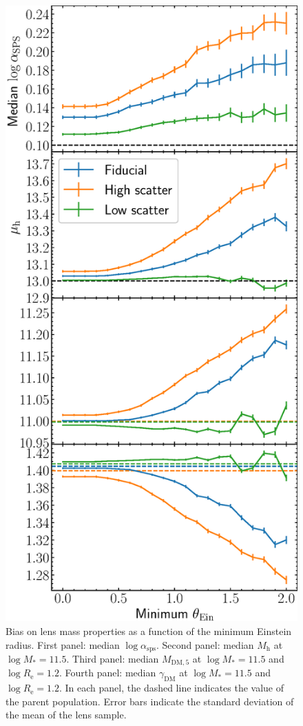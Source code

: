 \documentclass{aa}
\def\reff{R_{\mathrm{e}}}
\def\mstar{M_*}
\def\asps{\alpha_{\mathrm{sps}}}
\def\gammadm{\gamma_{\mathrm{DM}}}
\def\mdmfive{M_{\mathrm{DM}, 5}}
\def\mhalo{M_{\mathrm{h}}}
\begin{document}
\begin{figure}
\includegraphics[width=\columnwidth]{lens_mass_bias.eps}
\caption{
Bias on lens mass properties as a function of the minimum Einstein radius.
First panel: median $\log{\asps}$.
Second panel: median $\mhalo$ at $\log{\mstar}=11.5$.
Third panel: median $\mdmfive$ at $\log{\mstar}=11.5$ and $\log{\reff}=1.2$.
Fourth panel: median $\gammadm$ at $\log{\mstar}=11.5$ and $\log{\reff}=1.2$.
In each panel, the dashed line indicates the value of the parent population.
Error bars indicate the standard deviation of the mean of the lens sample.
\label{fig:lensmassbias}
}
\end{figure}
\end{document}
